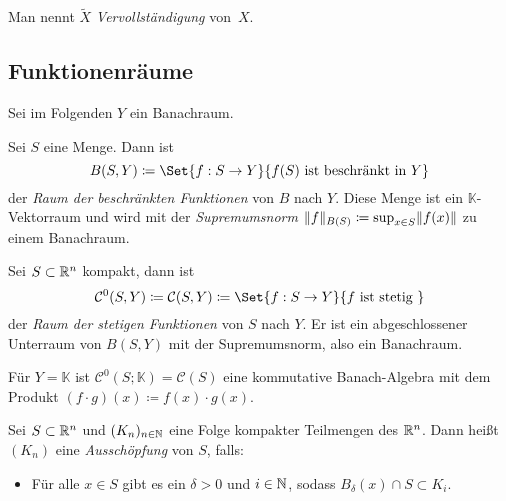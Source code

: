 \documentclass{cheat-sheet}
\newcommand{\K}{\mathbb{K}}
\begin{document}
\begin{defn}
  Man nennt $\widetilde{X}$ \emph{Vervollständigung} von~$X$.
\end{defn}

\subsection{Funktionenräume}

\begin{nota}
  Sei im Folgenden $Y$ ein Banachraum.
\end{nota}

\begin{defn}
  Sei $S$ eine Menge. Dann ist
  \[ B(S, Y) \coloneqq \Set{ f : S \to Y }{ f(S) \text { ist beschränkt in } Y } \]
  der \emph{Raum der beschränkten Funktionen} von $B$ nach $Y$. Diese Menge ist ein $\K$-Vektorraum und wird mit der \emph{Supremumsnorm} $\lVert f\rVert_{B(S)} \coloneqq \sup_{x \in S} \lVert f(x)\rVert$ zu einem Banachraum.
\end{defn}

\begin{defn}
  Sei $S \subset \mathbb{R}^n$ kompakt, dann ist
  \[ \mathcal{C}^0(S, Y) \coloneqq \mathcal{C}(S, Y) \coloneqq \Set{ f : S \to Y }{ f \text{ ist stetig } } \]
  der \emph{Raum der stetigen Funktionen} von $S$ nach $Y$. Er ist ein abgeschlossener Unterraum von $B(S, Y)$ mit der Supremumsnorm, also ein Banachraum.
\end{defn}


\begin{bem}
  Für $Y = \K$ ist $\mathcal{C}^0(S; \K) = \mathcal{C}(S)$ eine kommutative Banach-Algebra mit dem Produkt $(f \cdot g)(x) \coloneqq f(x) \cdot g(x)$.
\end{bem}

\begin{defn}
  Sei $S \subset \mathbb{R}^n$ und $(K_n)_{n \in \mathbb{N}}$ eine Folge kompakter Teilmengen des $\mathbb{R}^n$. Dann heißt $(K_n)$ eine \emph{Ausschöpfung} von $S$, falls:
  \begin{itemize}
    \item Für alle $x \in S$ gibt es ein $\delta > 0$ und $i \in \mathbb{N}$, sodass $B_\delta(x) \cap S \subset K_i$.
    \\[-4pt]
  \end{itemize}
\end{defn}
\end{document}

